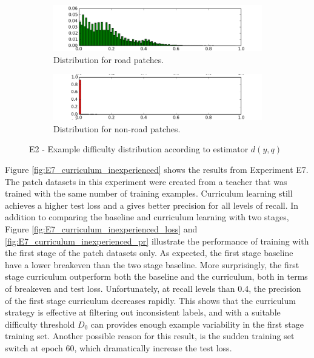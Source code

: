 \begin{figure}[!ht]
\begin{subfigure}{0.48\textwidth}
\includegraphics[width=\linewidth]{figs/E2/E2-road-dist.png}
\caption{Distribution for road patches.} \label{fig:E2_difficulty_distribution_road}
\end{subfigure}
\hspace*{\fill} %
\begin{subfigure}{0.48\textwidth}
\includegraphics[width=\linewidth]{figs/E2/E2-non_road-dist.png}
\caption{Distribution for non-road patches.} \label{fig:E2_difficulty_distribution_nonroad}
\end{subfigure}
\hspace*{\fill} %
\caption{E2 - Example difficulty distribution according to estimator $d(y,q)$ } \label{fig:E2_difficulty_distribution}
\end{figure}

Figure \ref{fig:E7_curriculum_inexperienced} shows the results from Experiment E7. The patch datasets in this experiment were created from a teacher that was trained with the same number of training examples. Curriculum learning still achieves a higher test loss and a gives better precision for all levels of recall. In addition to comparing the baseline and curriculum learning with two stages, Figure \ref{fig:E7_curriculum_inexperienced_loss} and \ref{fig:E7_curriculum_inexperienced_pr} illustrate the performance of training with the first stage of the patch datasets only. As expected, the first stage baseline have a lower breakeven than the two stage baseline. More surprisingly, the first stage curriculum outperform both the baseline and the curriculum, both in terms of breakeven and test loss. Unfortunately, at recall levels than 0.4, the precision of the first stage curriculum decreases rapidly. This shows that the curriculum strategy is effective at filtering out inconsistent labels, and with a suitable difficulty threshold $D_0$ can provides enough example variability in the first stage training set. Another possible reason for this result, is the sudden training set switch at epoch 60, which dramatically increase the test loss. \\

